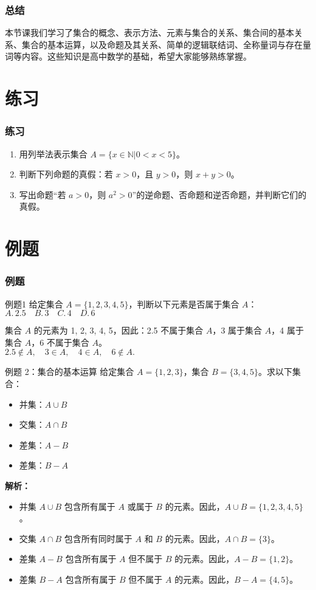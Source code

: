 \documentclass[aspectratio=169]{ctexbeamer} %
\begin{document}
\begin{frame}
\frametitle{总结}
本节课我们学习了集合的概念、表示方法、元素与集合的关系、集合间的基本关系、集合的基本运算，以及命题及其关系、简单的逻辑联结词、全称量词与存在量词等内容。这些知识是高中数学的基础，希望大家能够熟练掌握。
\end{frame}

\section{练习}

\begin{frame}
\frametitle{练习}
\begin{enumerate}[label={\arabic*.}]
\item 用列举法表示集合 \(A = \{x \in \mathbb{N} | 0 < x < 5\}\)。
\item 判断下列命题的真假：若 \(x > 0\)，且 \(y > 0\)，则 \(x + y > 0\)。
\item 写出命题“若 \(a > 0\)，则 \(a^2 > 0\)”的逆命题、否命题和逆否命题，并判断它们的真假。
\end{enumerate}
\end{frame}

\section{例题}
\begin{frame}
\frametitle{例题}
\begin{block}{例题1}
给定集合 \(A = \{1, 2, 3, 4, 5\}\)，判断以下元素是否属于集合 \(A\)：\\
$A. \, 2.5 \quad B.\, 3 \quad C.\, 4 \quad D. \, 6$
\end{block}
\pause
集合 \(A\) 的元素为 1, 2, 3, 4, 5，因此：2.5 不属于集合 \(A\)，3 属于集合 \(A\)，4 属于集合 \(A\)，6 不属于集合 \(A\)。\\
\( 2.5 \notin A, \quad 3 \in A, \quad 4 \in A, \quad 6 \notin A.\)
\end{frame}

\begin{frame}{例题 2：集合的基本运算}
给定集合 \(A = \{1, 2, 3\}\)，集合 \(B = \{3, 4, 5\}\)。求以下集合：
\begin{itemize}
    \item 并集：\(A \cup B\)
    \item 交集：\(A \cap B\)
    \item 差集：\(A - B\)
    \item 差集：\(B - A\)
\end{itemize}
\pause
\textbf{解析：}
\begin{itemize}
    \item 并集 \(A \cup B\) 包含所有属于 \(A\) 或属于 \(B\) 的元素。因此，\(A \cup B = \{1, 2, 3, 4, 5\}\)。
    \item 交集 \(A \cap B\) 包含所有同时属于 \(A\) 和 \(B\) 的元素。因此，\(A \cap B = \{3\}\)。
    \item 差集 \(A - B\) 包含所有属于 \(A\) 但不属于 \(B\) 的元素。因此，\(A - B = \{1, 2\}\)。
    \item 差集 \(B - A\) 包含所有属于 \(B\) 但不属于 \(A\) 的元素。因此，\(B - A = \{4, 5\}\)。
\end{itemize}
\end{frame}
\end{document}
